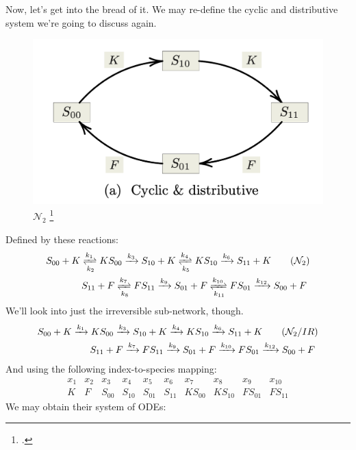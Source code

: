 Now, let's get into the bread of it. We may re-define the cyclic and distributive system we're going to discuss again.
\begin{figure}[H]
	\includegraphics[width=13cm]{math_pics/cyclic-distributive-n1.png}	
	\centering
	\caption{$\mathcal{N}_2$ \footcite{conradi2024}}
\end{figure}
Defined by these reactions:
\begin{align}\label{network2}
	S_{00} + K \xrightleftharpoons[ k_2 ]{k_1} KS_{00} \xrightarrow{k_3} S_{10} + K \xrightleftharpoons[ k_5 ]{k_4} KS_{10} \xrightarrow{k_6} S_{11} + K \tag{$\mathcal{N}_2$}
	\\
	S_{11} + F \xrightleftharpoons[ k_8 ]{k_7} FS_{11} \xrightarrow{k_9} S_{01} + F \xrightleftharpoons[ k_{11} ]{k_{10}} FS_{01} \xrightarrow{k_{12}} S_{00} + F \ \notag
\end{align}
We'll look into just the irreversible sub-network, though.
\begin{align}\label{network2_irr}
	S_{00} + K \xrightarrow{k_1} KS_{00} \xrightarrow{k_3} S_{10} + K \xrightarrow{k_4} KS_{10} \xrightarrow{k_6} S_{11} + K \tag{$\mathcal{N}_2 / IR$}
	\\
	S_{11} + F \xrightarrow{k_7} FS_{11} \xrightarrow{k_9} S_{01} + F \xrightarrow{k_{10}} FS_{01} \xrightarrow{k_{12}} S_{00} + F \ \notag
\end{align}
And using the following index-to-species mapping:
\[
	\begin{array}{ccccccccccc}x_{1}&x_{2}&x_{3}&x_{4}&x_{5}&x_{6}&x_{7}&x_{8}&x_{9}&x_{10}\\K&F&S_{00}&S_{10}&S_{01}&S_{11}&KS_{00}&KS_{10}&FS_{01}&FS_{11}
	\end{array}
\]
We may obtain their system of ODEs:

